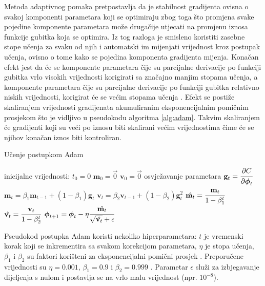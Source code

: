 \documentclass[times, utf8, diplomski, numeric]{fer}
\begin{document}
Metoda adaptivnog pomaka pretpostavlja da je stabilnost gradijenta ovisna o svakoj komponenti parametara koji se optimiraju zbog toga što promjena svake pojedine komponente parametara može drugačije utjecati na promjenu iznosa funkcije gubitka koja se optimira.
Iz tog razloga je smisleno koristiti zasebne stope učenja za svaku od njih i automatski im mijenjati vrijednost kroz postupak učenja, ovisno o tome kako se pojedina komponenta gradijenta mijenja.
Konačan efekt jest da će se komponente parametara čije su parcijalne derivacije po funkciji gubitka vrlo visokih vrijednosti korigirati sa značajno manjim stopama učenja, a komponente parametara čije su parcijalne derivacije po funkciji gubitka relativno niskih vrijednosti, korigirat će se većim stopama učenja \citep{book:deeplearningbook} \citep{seminar:rela}.
Efekt se postiže skaliranjem vrijednosti gradijenata akumuliranim eksponencijalnim pomičnim prosjekom  što je vidljivo u pseudokodu algoritma \ref{alg:adam}. 
Takvim skaliranjem će gradijenti koji su veći po iznosu biti skalirani većim vrijednostima čime će se njihov konačan iznos biti kontroliran.

\begin{algorithm}[H]
\caption{Učenje postupkom Adam}
\label{alg:adam}
\begin{algorithmic}
\STATE inicijalne vrijednosti:
\STATE $t_0 = 0$ 
\STATE  $\mathbf{m}_0 = \vec{0}$
\STATE  $\mathbf{v}_0 = \vec{0}$
\STATE osvježavanje parametara
\STATE $\mathbf{g}_t = \cfrac{\partial C}{\partial \boldsymbol{\phi}_t}$
\STATE $\mathbf{m}_t = \beta_1 \mathbf{m}_{t-1} + (1 - \beta_1) \mathbf{g}_t$
\STATE $\mathbf{v}_t = \beta_2 \mathbf{v}_{t-1} + (1 - \beta_2) \mathbf{g}_t^2$
\STATE $\hat{\mathbf{m}_t} = \cfrac{\mathbf{m}_t}{1 - \beta_1^t}$
\STATE $\hat{\mathbf{v}_t} = \cfrac{\mathbf{v}_t}{1 - \beta_2^t}$
\STATE $\boldsymbol{\phi}_{t+1} = \boldsymbol{\phi}_t - \eta \cfrac{\hat{\mathbf{m}_t}}{\sqrt{\hat{\mathbf{v}_t}} + \epsilon}$
\end{algorithmic}
\end{algorithm}

Pseudokod postupka Adam koristi nekoliko hiperparametara: $t$ je vremenski korak koji se inkrementira sa svakom korekcijom parametara, $\eta$ je stopa učenja, $\beta_1$ i $\beta_2$ su faktori korišteni za
eksponencijalni pomični prosjek . Preporučene vrijednosti su $\eta=0.001$, $\beta_1=0.9$ i $\beta_2=0.999$ \citep{article:adam}.
Parametar $\epsilon$ služi za izbjegavanje dijeljenja s nulom i postavlja se na vrlo malu vrijednost (npr. $10^{-8}$).
\end{document}
